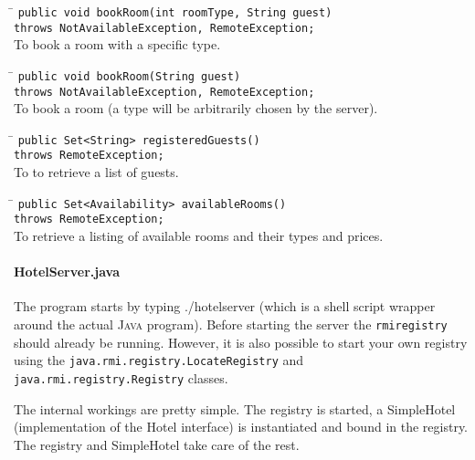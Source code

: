\documentclass[a4paper,10pt]{article}
\begin{document}
\begin{tabbing}
\hspace{20pt}\=\kill
 \> \texttt{publ}\=\texttt{ic void bookRoom(int roomType, String guest)} \+ \\
 \> \texttt{throws NotAvailableException, RemoteException;} \- \\
 \> To book a room with a specific type.
\end{tabbing}

\begin{tabbing}
\hspace{20pt}\=\kill
 \> \texttt{publ}\=\texttt{ic void bookRoom(String guest)} \+\\
 \> \texttt{throws NotAvailableException, RemoteException;} \- \\
 \> To book a room (a type will be arbitrarily chosen by the server).
\end{tabbing}

\begin{tabbing}
\hspace{20pt}\=\kill
 \> \texttt{publ}\=\texttt{ic Set<String> registeredGuests()} \+\\
 \> \texttt{throws RemoteException;} \- \\
 \> To to retrieve a list of guests.
\end{tabbing}

\begin{tabbing}
\hspace{20pt}\=\kill
 \> \texttt{publ}\=\texttt{ic Set<Availability> availableRooms()} \+\\
 \> \texttt{throws RemoteException;} \- \\
 \> To retrieve a listing of available rooms and their types and prices.
\end{tabbing}


\paragraph{HotelServer.java}
The program starts by typing ./hotelserver (which is a shell script wrapper around the actual \textsc{Java} program). Before starting the server the \texttt{rmiregistry} should already be running. However, it is also possible to start your own registry using the \texttt{java.rmi.registry.LocateRegistry} and \texttt{java.rmi.registry.Registry} classes.

The internal workings are pretty simple. The registry is started, a SimpleHotel (implementation of the Hotel interface) is instantiated and bound in the registry. The registry and SimpleHotel take care of the rest. 
\end{document}
